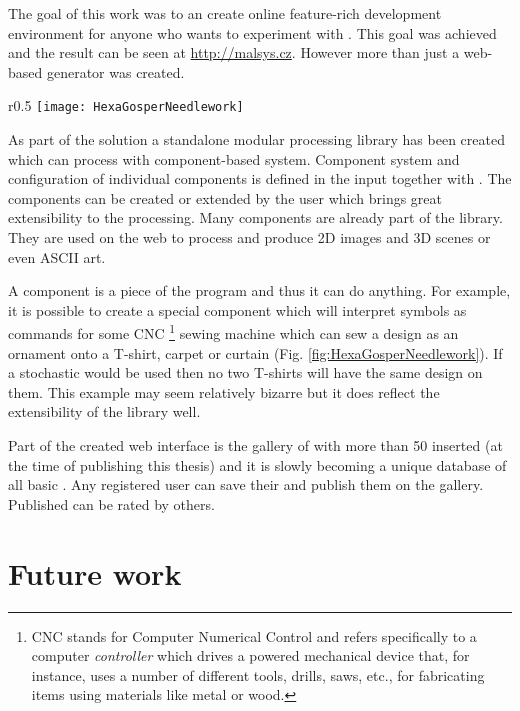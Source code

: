 

The goal of this work was to an create online feature-rich development environment for anyone who wants to experiment with \lsystems.
This goal was achieved and the result can be seen at \url{http://malsys.cz}.
However more than just a web-based \lsystem generator was created.

\begin{wrapfigure}{r}{0.5\textwidth}
	\texttt{[image: HexaGosperNeedlework]}
	\caption{Needlework of Hexagonal Gosper curve}
	\label{fig:HexaGosperNeedlework}
\end{wrapfigure}

As part of the solution a standalone modular \lsystem processing library has been created which can process \lsystems with component-based system.
Component system and configuration of individual components is defined in the input together with \lsystems.
The components can be created or extended by the user which brings great extensibility to the \lsystem processing.
Many components are already part of the library.
They are used on the web to process \lsystems and produce 2D images and 3D scenes or even ASCII art.

A component is a piece of the program and thus it can do anything.
For example, it is possible to create a special component which will interpret \lsystem symbols as commands for some CNC%
	\footnote{CNC stands for Computer Numerical Control and refers specifically to a computer \emph{controller} which drives a powered mechanical device
		that, for instance, uses a number of different tools, drills, saws, etc., for fabricating items using materials like metal or wood.} 
	sewing machine which can sew a design as an ornament onto a T-shirt, carpet or curtain (Fig. \ref{fig:HexaGosperNeedlework}).
If a stochastic \lsystem would be used then no two T-shirts will have the same design on them.
This example may seem relatively bizarre but it does reflect the extensibility of the library well.

Part of the created web interface is the gallery of \lsystems with more than 50 inserted \lsystems (at the time of publishing this thesis) and it is slowly becoming a unique database of all basic \lsystems.
Any registered user can save their \lsystems and publish them on the gallery.
Published \lsystems can be rated by others.


\section*{Future work}

